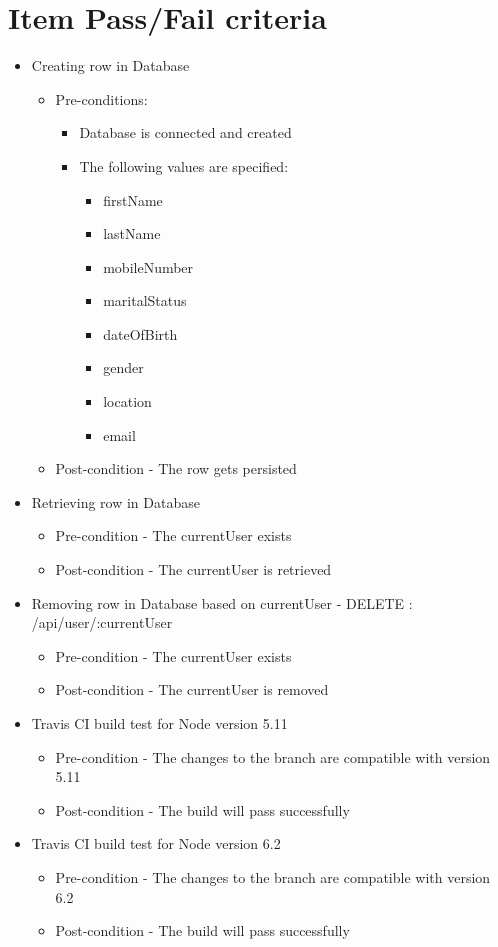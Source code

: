\documentclass{article}
\begin{document}
\section{Item Pass/Fail criteria}\label{sec:FailPass}
\begin{itemize}
\item Creating row in Database
\begin{itemize}
	\item Pre-conditions:
		\begin{itemize}
		\item Database is connected and created
		\item The following values are specified:  
		\begin{itemize}
		\item firstName
  		\item lastName
  		\item mobileNumber 
  		\item maritalStatus 
  		\item dateOfBirth 
 		\item gender
  		\item location 
 		\item email
 		\end{itemize} 
		\end{itemize}
\item Post-condition - The row gets persisted
\end{itemize}
\item Retrieving row in Database
	\begin{itemize}
	\item Pre-condition - The currentUser exists
	\item Post-condition - The currentUser is retrieved 
	\end{itemize}

\item Removing row in Database based on currentUser - DELETE : /api/user/:currentUser
	\begin{itemize}
	\item Pre-condition - The currentUser exists
	\item Post-condition - The currentUser is removed
	\end{itemize}

\item Travis CI build test for Node version 5.11
	\begin{itemize}
	\item Pre-condition - The changes to the branch are compatible with version 5.11
	\item Post-condition - The build will pass successfully 
	\end{itemize}	
	
\item Travis CI build test for Node version 6.2
	\begin{itemize}
	\item Pre-condition - The changes to the branch are compatible with version 6.2
	\item Post-condition - The build will pass successfully 
\end{itemize}
\end{itemize}
\end{document}
